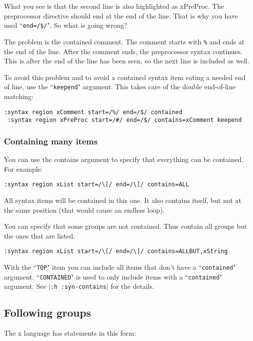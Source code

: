 What you see is that the second line is also highlighted as xPreProc.
The preprocessor directive should end at the end of the line.
That is why you have used ``\texttt{end=/\$/}".
So what is going wrong?

The problem is the contained comment.
The comment starts with \texttt{\%} and ends at the end of the line.
After the comment ends, the preprocessor syntax continues.
This is after the end of the line has been seen, so the next line is included as well.

To avoid this problem and to avoid a contained syntax item eating a needed end of line, use the ``\texttt{keepend}" argument.
This takes care of the double end-of-line matching:

\begin{Verbatim}[samepage=true]
 :syntax region xComment start=/%/ end=/$/ contained
 :syntax region xPreProc start=/#/ end=/$/ contains=xComment keepend
\end{Verbatim}

\subsubsection{Containing many items}
You can use the contains argument to specify that everything can be contained.
For example:

\begin{Verbatim}[samepage=true]
 :syntax region xList start=/\[/ end=/\]/ contains=ALL
\end{Verbatim}

All syntax items will be contained in this one.
It also contains itself, but not at the same position (that would cause an endless loop).

You can specify that some groups are not contained.
Thus contain all groups but the ones that are listed:

\begin{Verbatim}[samepage=true]
 :syntax region xList start=/\[/ end=/\]/ contains=ALLBUT,xString
\end{Verbatim}

With the ``\texttt{TOP}" item you can include all items that don't have a ``\texttt{contained}" argument.
``\texttt{CONTAINED}" is used to only include items with a ``\texttt{contained}" argument.
See |\texttt{:h :syn-contains}| for the details.
\subsection{Following groups}
The x language has statements in this form:

